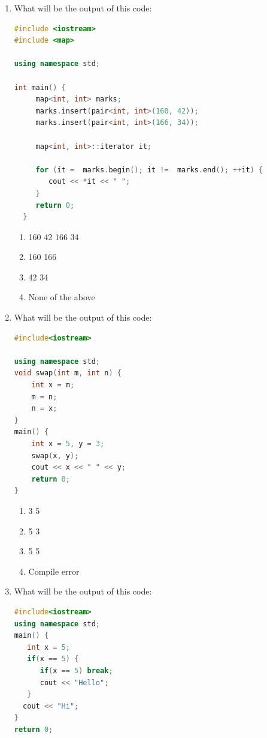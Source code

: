 \documentclass[10pt]{article}
\begin{document}
\begin{enumerate}
\item What will be the output of this code:
\begin{lstlisting}[language=C++]
#include <iostream> 
#include <map> 
   
using namespace std; 
   
int main() { 
     map<int, int> marks; 
     marks.insert(pair<int, int>(160, 42)); 
     marks.insert(pair<int, int>(166, 34)); 
   
     map<int, int>::iterator it; 

     for (it =  marks.begin(); it !=  marks.end(); ++it) { 
        cout << *it << " "; 
     } 
     return 0;     
  }

\end{lstlisting}
\begin{multicols}{4}
\begin{enumerate}
    \item 160 42 166 34
    \item 160 166
    \item 42 34
    \item None of the above
\end{enumerate}
\end{multicols}






\item What will be the output of this code:
\begin{lstlisting}[language=C++]
#include<iostream>

using namespace std;
void swap(int m, int n) {
    int x = m;
    m = n;
    n = x;
}
main() {
    int x = 5, y = 3;
    swap(x, y);
    cout << x << " " << y;
    return 0;
}
\end{lstlisting}
\begin{multicols}{4}
\begin{enumerate}
    \item 3 5
    \item 5 3
    \item 5 5
    \item Compile error
\end{enumerate}
\end{multicols}





\item What will be the output of this code:
\begin{lstlisting}[language=C++]
#include<iostream>
using namespace std;
main() { 
   int x = 5;
   if(x == 5) {	
      if(x == 5) break;
      cout << "Hello";
   } 
  cout << "Hi"; 
}
return 0;


\end{lstlisting}
\end{enumerate}
\end{document}
